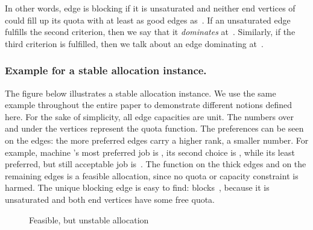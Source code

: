 \documentclass{llncs}
\begin{document}
In other words, edge  is blocking if it is unsaturated and neither end vertices of  could fill up its quota with at least as good edges as~. If an unsaturated edge fulfills the second criterion, then we say that it \emph{dominates}  at~. Similarly, if the third criterion is fulfilled, then we talk about an edge dominating  at~.

\subsubsection{Example for a stable allocation instance.}
The figure below illustrates a stable allocation instance. We use the same example throughout the entire paper to demonstrate different notions defined here. For the sake of simplicity, all edge capacities are unit. The numbers over and under the vertices represent the quota function. The preferences can be seen on the edges: the more preferred edges carry a higher rank, a smaller number. For example, machine 's most preferred job is , its second choice is , while its least preferred, but still acceptable job is~. The function  on the thick edges and  on the remaining edges is a feasible allocation, since no quota or capacity constraint is harmed. The unique blocking edge is easy to find:  blocks~, because it is unsaturated and both end vertices have some free quota.

\begin{figure}[H]
\begin{center}
\end{center}
\caption{Feasible, but unstable allocation}
\label{fig:ex}
\end{figure}
\end{document}

